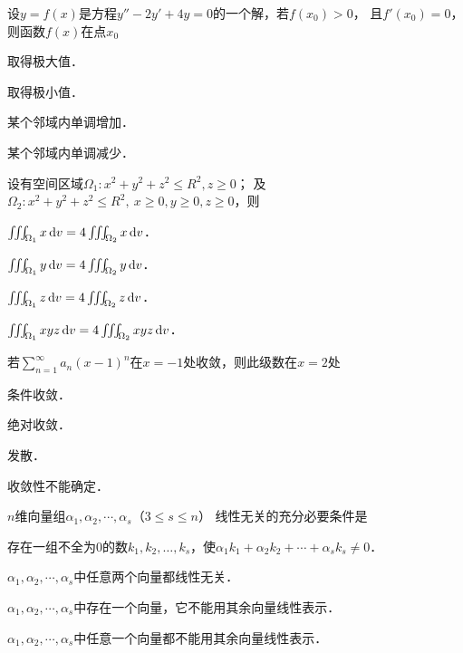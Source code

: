 \documentclass[plain,noanswer,medmath]{../../template/jnuexam}
\begin{document}
\begin{problem}
设$y=f(x)$是方程$y''-2y'+4y=0$的一个解，若$f(x_0)>0$，
且$f'(x_0)=0$，则函数$f(x)$在点$x_0$ \pickout{}
\begin{abcd}
\item 取得极大值．
\item 取得极小值．
\item 某个邻域内单调增加．
\item 某个邻域内单调减少．
\end{abcd}
\end{problem}


\begin{problem}
设有空间区域$\Omega_1:x^2+y^2+z^2\le R^2,z\ge 0$；\newline
及$\Omega_2:x^2+y^2+z^2\le R^2,~x\ge 0,y\ge 0,z\ge 0$，则 \pickout{}
\begin{abcd}
\item $\iiint_{\Omega_1}x\mathop{}\!\mathrm{d} v=4\iiint_{\Omega_2}x\mathop{}\!\mathrm{d} v$．
\item $\iiint_{\Omega_1}y\mathop{}\!\mathrm{d} v=4\iiint_{\Omega_2}y\mathop{}\!\mathrm{d} v$．
\item $\iiint_{\Omega_1}z\mathop{}\!\mathrm{d} v=4\iiint_{\Omega_2}z\mathop{}\!\mathrm{d} v$．
\item $\iiint_{\Omega_1}xyz\mathop{}\!\mathrm{d} v=4\iiint_{\Omega_2}xyz\mathop{}\!\mathrm{d} v$．
\end{abcd}
\end{problem}


\begin{problem}
若$\sum_{n=1}^{\infty}a_n(x-1)^n$在$x=-1$处收敛，则此级数在$x=2$处 \pickout{}
\begin{abcd}
\item 条件收敛．
\item 绝对收敛．
\item 发散．
\item 收敛性不能确定．
\end{abcd}
\end{problem}


\begin{problem}
$n$维向量组$\alpha_1,\alpha_2,\cdots,\alpha_s$（$3\le s\le n$）%
线性无关的充分必要条件是 \pickout{}
\begin{abcd}
\item 存在一组不全为$0$的数$k_1,k_2,\ldots,k_s$，使$\alpha_1k_1+\alpha_2k_2+\cdots+\alpha_sk_s\ne 0$．
\item $\alpha_1,\alpha_2,\cdots,\alpha_s$中任意两个向量都线性无关．
\item $\alpha_1,\alpha_2,\cdots,\alpha_s$中存在一个向量，它不能用其余向量线性表示．
\item $\alpha_1,\alpha_2,\cdots,\alpha_s$中任意一个向量都不能用其余向量线性表示．
\end{abcd}
\end{problem}
\end{document}
